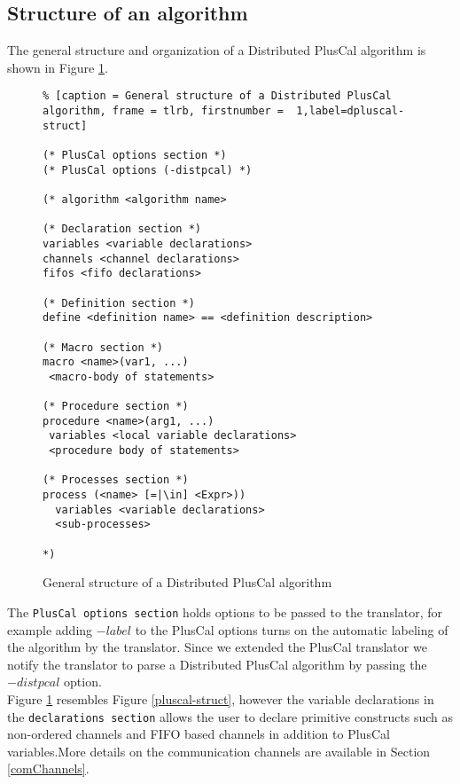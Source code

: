 \documentclass[journal]{IEEEtran}
\begin{document}
\subsection{Structure of an algorithm}

The general structure and organization of a Distributed PlusCal algorithm is shown in Figure \ref{dpluscal-struct}.


\begin{figure}
\begin{lstlisting}% [caption = General structure of a Distributed PlusCal algorithm, frame = tlrb, firstnumber =  1,label=dpluscal-struct]

(* PlusCal options section *)
(* PlusCal options (-distpcal) *)

(* algorithm <algorithm name>

(* Declaration section *)
variables <variable declarations>
channels <channel declarations>
fifos <fifo declarations>

(* Definition section *)
define <definition name> == <definition description>

(* Macro section *)
macro <name>(var1, ...)
 <macro-body of statements>

(* Procedure section *)
procedure <name>(arg1, ...)
 variables <local variable declarations>
 <procedure body of statements>

(* Processes section *)
process (<name> [=|\in] <Expr>))
  variables <variable declarations>
  <sub-processes>

*)

\end{lstlisting}
\caption{General structure of a Distributed PlusCal algorithm}
\label{dpluscal-struct}
\end{figure}

The \verb|PlusCal options section| holds options to be passed to the translator, for example adding $-label$ to the PlusCal options turns on the automatic labeling of the algorithm by the translator. Since we extended the PlusCal translator we notify the translator to parse a Distributed PlusCal algorithm by passing the $-distpcal$ option.\\

Figure \ref{dpluscal-struct} resembles Figure \ref{pluscal-struct}, however the variable declarations in the \verb|declarations section| allows the user to declare primitive constructs such as non-ordered channels and FIFO based channels in addition to PlusCal variables.More details on the communication channels are available in Section \ref{comChannels}.
\end{document}
